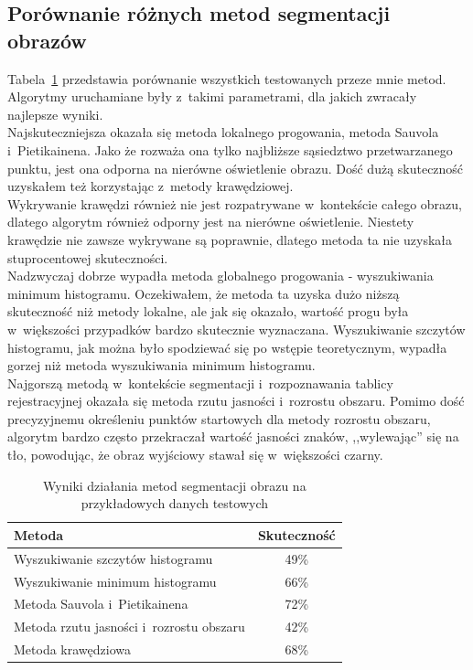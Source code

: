 \subsection{Porównanie różnych metod segmentacji obrazów}
Tabela~\ref{tab:all_methods_comparision} przedstawia porównanie wszystkich testowanych przeze mnie metod. Algorytmy uruchamiane były z~takimi parametrami, dla jakich zwracały najlepsze wyniki. \\
Najskuteczniejsza okazała się metoda lokalnego progowania, metoda Sauvola i~Pietikainena. Jako że rozważa ona tylko najbliższe sąsiedztwo przetwarzanego punktu, jest ona odporna na nierówne oświetlenie obrazu. Dość dużą skuteczność uzyskałem też korzystając z~metody krawędziowej. \\
Wykrywanie krawędzi również nie jest rozpatrywane w~kontekście całego obrazu, dlatego algorytm również odporny jest na nierówne oświetlenie. Niestety krawędzie nie zawsze wykrywane są poprawnie, dlatego metoda ta nie uzyskała stuprocentowej skuteczności. \\
Nadzwyczaj dobrze wypadła metoda globalnego progowania - wyszukiwania minimum histogramu. Oczekiwałem, że metoda ta uzyska dużo niższą skuteczność niż metody lokalne, ale jak się okazało, wartość progu była w~większości przypadków bardzo skutecznie wyznaczana. Wyszukiwanie szczytów histogramu, jak można było spodziewać się po wstępie teoretycznym, wypadła gorzej niż metoda wyszukiwania minimum histogramu. \\
Najgorszą metodą w~kontekście segmentacji i~rozpoznawania tablicy rejestracyjnej okazała się metoda rzutu jasności i~rozrostu obszaru. Pomimo dość precyzyjnemu określeniu punktów startowych dla metody rozrostu obszaru, algorytm bardzo często przekraczał wartość jasności znaków, ,,wylewając'' się na tło, powodując, że obraz wyjściowy stawał się w~większości czarny.

\begin {table}
  \begin{center}
    \begin{tabular}{l | c}
      Metoda & Skuteczność \\
      \hline
      Wyszukiwanie szczytów histogramu & 49\% \\
      Wyszukiwanie minimum histogramu & 66\% \\
      Metoda Sauvola i~Pietikainena & 72\% \\
      Metoda rzutu jasności i~rozrostu obszaru & 42\% \\
      Metoda krawędziowa & 68\%
    \end{tabular}
    \caption {Wyniki działania metod segmentacji obrazu na przykładowych danych testowych}
    \label{tab:all_methods_comparision} 
  \end{center}
\end {table}

